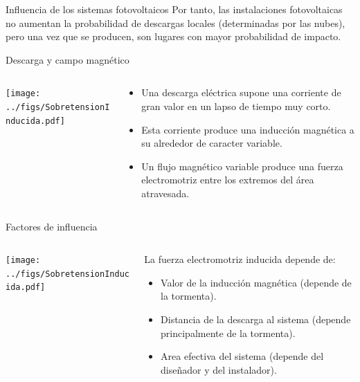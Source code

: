 \documentclass[aspectratio=169, usenames,svgnames,dvipsnames]{beamer}
\begin{document}
\begin{frame}[label={sec:org7377457}]{Influencia de los sistemas fotovoltaicos}
Por tanto, \alert{las instalaciones fotovoltaicas no aumentan la probabilidad
de descargas locales} (determinadas por las nubes), pero una vez que se
producen, son lugares con mayor probabilidad de impacto.
\end{frame}

\begin{frame}[label={sec:org3c1706a},plain]{Descarga y campo magnético}
\begin{columns}
\begin{column}{0.4\columnwidth}
\begin{center}
\texttt{[image: ../figs/SobretensionInducida.pdf]}
\end{center}
\end{column}
\begin{column}{0.6\columnwidth}
\begin{itemize}
\item Una descarga eléctrica supone una \alert{corriente de gran valor} en un lapso de \alert{tiempo muy corto}.

\item Esta corriente produce una \alert{inducción magnética} a su alrededor de caracter \alert{variable}.

\item Un flujo magnético variable produce una \alert{fuerza electromotriz} entre los extremos del área atravesada.
\end{itemize}
\end{column}
\end{columns}
\end{frame}

\begin{frame}[label={sec:orgd7de4a1},plain]{Factores de influencia}
\begin{columns}
\begin{column}{0.4\columnwidth}
\begin{center}
\texttt{[image: ../figs/SobretensionInducida.pdf]}
\end{center}
\end{column}
\begin{column}{0.6\columnwidth}
La fuerza electromotriz inducida depende de:

\begin{itemize}
\item \alert{Valor de la inducción magnética} (depende de la tormenta).

\item \alert{Distancia} de la descarga al sistema (depende principalmente de la
tormenta).

\item \alert{Area efectiva del sistema} (depende del diseñador y del instalador).
\end{itemize}
\end{column}
\end{columns}
\end{frame}
\end{document}
